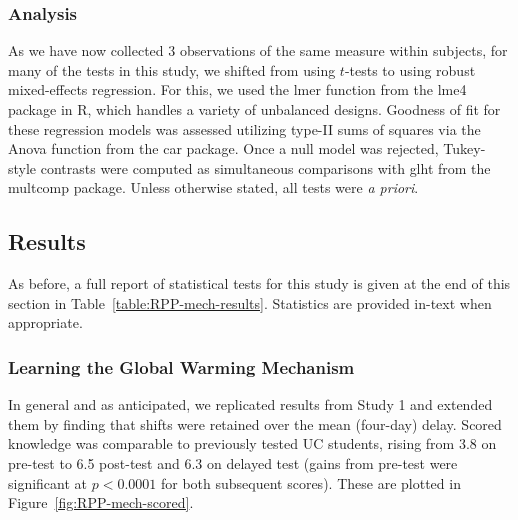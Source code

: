 \subsubsection{Analysis}

As we have now collected 3 observations of the same measure within subjects, for
many of the tests in this study, we shifted from using $t$-tests to using robust
mixed-effects regression. For this, we used the \textsf{lmer} function from the
\textsf{lme4} package in R, which handles a variety of unbalanced designs.
Goodness of fit for these regression models was assessed utilizing type-II
sums of squares via the \textsf{Anova} function from the \textsf{car} package.
Once a null model was rejected, Tukey-style contrasts were computed as
simultaneous comparisons with \textsf{glht} from the \textsf{multcomp} package.
Unless otherwise stated, all tests were \emph{a priori}.

\subsection{Results} 

As before, a full report of statistical tests for this study is given at the end of this
section in Table~\ref{table:RPP-mech-results}. Statistics are provided in-text
when appropriate.
    
\subsubsection{Learning the Global Warming Mechanism}

In general and as anticipated, we replicated results from Study 1 and
extended them by finding that shifts were retained over the mean (four-day)
delay.  Scored knowledge was comparable to previously tested UC students, rising
from 3.8 on pre-test to 6.5 post-test and 6.3 on delayed test (gains from pre-test
were significant at $p<0.0001$ for both subsequent scores). These are plotted in
Figure~\ref{fig:RPP-mech-scored}. 

